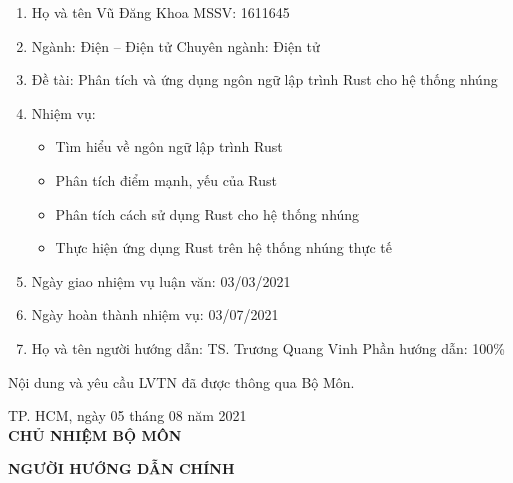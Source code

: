 \bigskip
\bigskip
\bigskip
\begin{minipage}{\textwidth}
\begin{enumerate}
    \item Họ và tên \hspace{0.25cm} Vũ Đăng Khoa \hspace{0.25cm} MSSV: 1611645
    \item Ngành: \hspace{0.25cm} Điện -- Điện tử \hspace{0.25cm} Chuyên ngành: Điện tử
    \item Đề tài: Phân tích và ứng dụng ngôn ngữ lập trình Rust cho hệ thống nhúng
    \item Nhiệm vụ:
        \begin{itemize}
            \item Tìm hiểu về ngôn ngữ lập trình Rust
            \item Phân tích điểm mạnh, yếu của Rust
            \item Phân tích cách sử dụng Rust cho hệ thống nhúng
            \item Thực hiện ứng dụng Rust trên hệ thống nhúng thực tế
        \end{itemize}
    \item Ngày giao nhiệm vụ luận văn: 03/03/2021
    \item Ngày hoàn thành nhiệm vụ: 03/07/2021
    \item Họ và tên người hướng dẫn: TS. Trương Quang Vinh \hspace{0.25cm} Phần hướng dẫn: 100\%
\end{enumerate}

\hspace{0.5cm}Nội dung và yêu cầu LVTN đã được thông qua Bộ Môn.
\end{minipage}

\bigskip
\bigskip
\bigskip
\begin{minipage}{0.5\textwidth}
\raggedleft
\begin{center}
TP. HCM, ngày 05 tháng 08 năm 2021\\
\textbf{CHỦ NHIỆM BỘ MÔN}
\end{center}
\end{minipage}
\hfill
\begin{minipage}{0.5\textwidth}
\raggedright
\begin{center}
\textbf{NGƯỜI HƯỚNG DẪN CHÍNH}
\end{center}
\end{minipage}
\restoregeometry

